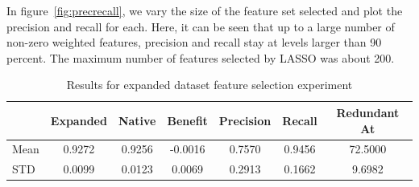 In figure~\ref{fig:precrecall}, we vary the size of the feature set selected and plot the precision and recall for each. Here, it can be seen that up to a large number of non-zero weighted features, precision and recall stay at levels larger than 90 percent. The maximum number of features selected by LASSO was about 200.

\begin{table}
\begin{tabular}{lcccccc}
\hline
&Expanded&Native&Benefit&Precision&Recall&Redundant At
\\
\hline
Mean&0.9272&0.9256&-0.0016&0.7570&0.9456&72.5000 \\
STD&0.0099&0.0123&0.0069&0.2913&0.1662&9.6982
\end{tabular}
\caption{Results for expanded dataset feature selection experiment}
\label{tab:expandedResult}
\end{table}